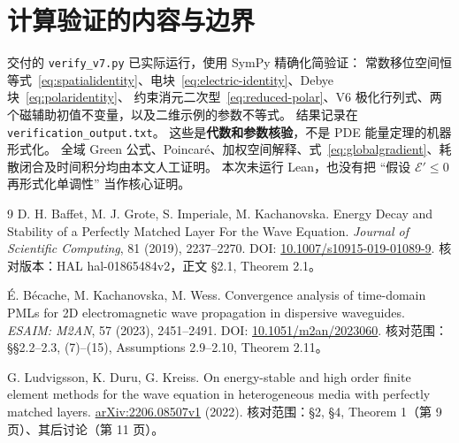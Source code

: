 \documentclass[UTF8,a4paper,11pt,fontset=none]{ctexart}
\numberwithin{equation}{section}
\theoremstyle{definition}
\theoremstyle{definition}
\newcommand{\Ecal}{\mathcal E}
\begin{document}
\section{计算验证的内容与边界}
交付的 \texttt{verify\_v7.py} 已实际运行，使用 SymPy 精确化简验证：
常数移位空间恒等式~\eqref{eq:spatialidentity}、电块~\eqref{eq:electric-identity}、Debye 块~\eqref{eq:polaridentity}、
约束消元二次型~\eqref{eq:reduced-polar}、V6 极化行列式、两个磁辅助初值不变量，以及二维示例的参数不等式。
结果记录在 \texttt{verification\_output.txt}。
这些是\textbf{代数和参数核验}，不是 PDE 能量定理的机器形式化。
全域 Green 公式、Poincar\'e、加权空间解释、式~\eqref{eq:globalgradient}、耗散闭合及时间积分均由本文人工证明。
本次未运行 Lean，也没有把 ``假设 $\Ecal'\le0$ 再形式化单调性'' 当作核心证明。

\begin{thebibliography}{9}
D. H. Baffet, M. J. Grote, S. Imperiale, M. Kachanovska.
Energy Decay and Stability of a Perfectly Matched Layer For the Wave Equation.
\emph{Journal of Scientific Computing}, 81 (2019), 2237--2270.
DOI: \href{https://doi.org/10.1007/s10915-019-01089-9}{10.1007/s10915-019-01089-9}.
核对版本：HAL hal-01865484v2，正文 §2.1, Theorem 2.1。

É. Bécache, M. Kachanovska, M. Wess.
Convergence analysis of time-domain PMLs for 2D electromagnetic wave propagation in dispersive waveguides.
\emph{ESAIM: M2AN}, 57 (2023), 2451--2491.
DOI: \href{https://doi.org/10.1051/m2an/2023060}{10.1051/m2an/2023060}.
核对范围：§§2.2--2.3, (7)--(15), Assumptions 2.9--2.10, Theorem 2.11。

G. Ludvigsson, K. Duru, G. Kreiss.
On energy-stable and high order finite element methods for the wave equation in heterogeneous media with perfectly matched layers.
\href{https://arxiv.org/abs/2206.08507}{arXiv:2206.08507v1} (2022).
核对范围：§2, §4, Theorem 1（第 9 页）、其后讨论（第 11 页）。
\end{thebibliography}
\end{document}
